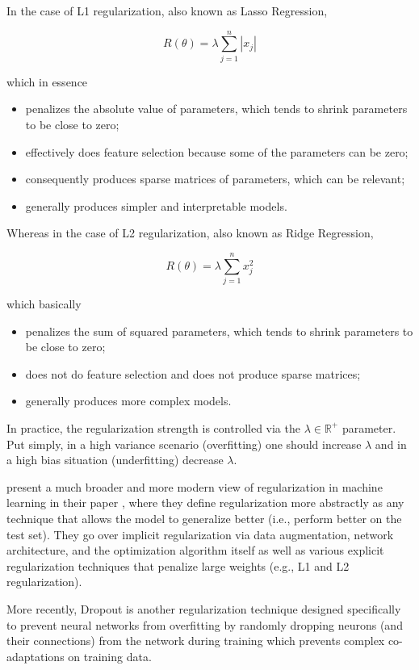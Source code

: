 In the case of L1 regularization, also known as Lasso Regression,

$$
R(\theta) = \lambda \sum_{j=1}^{n} |x_j|
$$

which in essence

\begin{itemize}
    \item penalizes the absolute value of parameters, which tends to shrink parameters to be close to zero;
    \item effectively does feature selection because some of the parameters can be zero;
    \item consequently produces sparse matrices of parameters, which can be relevant;
    \item generally produces simpler and interpretable models.
\end{itemize}

Whereas in the case of L2 regularization, also known as Ridge Regression,

$$
R(\theta) = \lambda \sum_{j=1}^{n} x_j^2
$$

which basically

\begin{itemize}
    \item penalizes the sum of squared parameters, which tends to shrink parameters to be close to zero;
    \item does not do feature selection and does not produce sparse matrices;
    \item generally produces more complex models.
\end{itemize}

In practice, the regularization strength is controlled via the $\lambda \in \mathbb{{R}^{+}}$ parameter. Put simply, in a high variance scenario (overfitting) one should increase $\lambda$ and in a high bias situation (underfitting) decrease $\lambda$.

\citeauthor{regularizationsurvey} present a much broader and more modern view of regularization in machine learning in their \citeyear{regularizationsurvey} paper \cite{regularizationsurvey}, where they define regularization more abstractly as any technique that allows the model to generalize better (i.e., perform better on the test set). They go over implicit regularization via data augmentation, network architecture, and the optimization algorithm itself as well as various explicit regularization techniques that penalize large weights (e.g., L1 and L2 regularization).

More recently, Dropout \cite{dropout} is another regularization technique designed specifically to prevent neural networks from overfitting by randomly dropping neurons (and their connections) from the network during training which prevents complex co-adaptations on training data.

